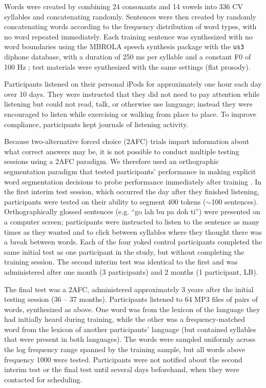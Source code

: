 \documentclass[10pt]{article}
\begin{document}
Words were created by combining 24 consonants and 14 vowels into 336 CV syllables and concatenating randomly. Sentences were then created by randomly concatenating words according to the frequency distribution of word types, with no word repeated immediately. Each training sentence was synthesized with no word boundaries using the MBROLA speech synthesis package with the \texttt{us3} diphone database, with a duration of 250 ms per syllable and a constant F0 of 100 Hz \cite{dutoit1996}; test materials were synthesized with the same settings (flat prosody).

Participants listened on their personal iPods for approximately one hour each day over 10 days. They were instructed that they did not need to pay attention while listening but could not read, talk, or otherwise use language; instead they were encouraged to listen while exercising or walking from place to place. To improve compliance, participants kept journals of listening activity. 

Because two-alternative forced choice (2AFC) trials impart information about what correct answers may be, it is not possible to conduct multiple testing sessions using a 2AFC paradigm. We therefore used an orthographic segmentation paradigm that tested participants' performance in making explicit word segmentation decisions to probe performance immediately after training \cite{frank2010b,kurumada2011}. 
In the first interim test session, which occurred the day after they finished listening, participants were tested on their ability to segment 400 tokens ($\sim$100 sentences). Orthographically glossed sentences (e.g. ``go lah bu pa doh ti'') were presented on a computer screen; participants were instructed to listen to the sentence as many times as they wanted and to click between syllables where they thought there was a break between words. Each of the four yoked control participants completed the same initial test as one participant in the study, but without completing the training session. The second interim test was identical to the first and was administered after one month (3 participants) and 2 months (1 participant, LB). 

The final test was a 2AFC, administered approximately 3 years after the initial testing session (36 -- 37 months). Participants listened to 64 MP3 files of pairs of words, synthesized as above. One word was from the lexicon of the language they had initially heard during training, while the other was a frequency-matched word from the lexicon of another participants' language (but contained syllables that were present in both languages). The words were sampled uniformly across the log frequency range spanned by the training sample, but all words above frequency 1000 were tested.  Participants were not notified about the second interim test or the final test until several days beforehand, when they were contacted for scheduling. 
\end{document}
